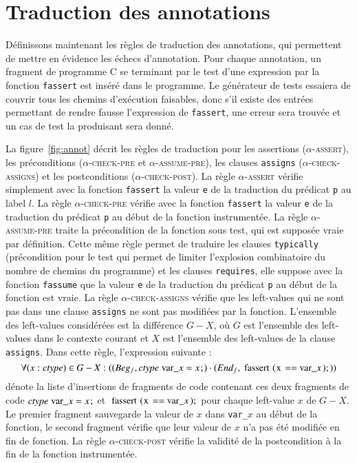 \section{Traduction des annotations \eacsl}
\label{sec:annot}


Définissons maintenant les règles de traduction des
annotations, qui permettent de mettre en évidence les échecs d'annotation.
Pour chaque annotation, un fragment de programme C se terminant par le test
d'une expression par la fonction \lstinline'fassert' est inséré dans le
programme.
Le générateur de tests essaiera de couvrir tous les chemins d'exécution
faisables, donc s'il existe des entrées permettant de rendre fausse
l'expression de \lstinline'fassert', une erreur sera trouvée et un cas de test
la produisant sera donné.



La figure~\ref{fig:annot} décrit les règles de traduction pour les assertions
(\textsc{$\alpha$-assert}), les préconditions (\textsc{$\alpha$-check-pre} et
\textsc{$\alpha$-assume-pre}), les clauses \lstinline'assigns'
(\textsc{$\alpha$-check-assigns}) et les postconditions
(\textsc{$\alpha$-check-post}).
La règle \textsc{$\alpha$-assert} vérifie simplement avec la fonction
\lstinline'fassert' la valeur \lstinline'e' de la traduction du prédicat
\lstinline'p' au label $l$.
La règle \textsc{$\alpha$-check-pre} vérifie avec la fonction
\lstinline'fassert' la valeur \lstinline'e' de la traduction du prédicat
\lstinline'p' au début de la fonction instrumentée.
La règle \textsc{$\alpha$-assume-pre} traite la précondition de la fonction sous
test, qui est supposée vraie par définition.
Cette même règle permet de traduire les clauses \lstinline'typically'
(précondition pour le test qui permet de limiter l'explosion combinatoire du
nombre de chemins du programme) et les clauses \lstinline'requires', elle
suppose avec la fonction \lstinline'fassume' que la valeur \lstinline'e' de la
traduction du prédicat \lstinline'p' au début de la fonction est vraie.
La règle \textsc{$\alpha$-check-assigns} vérifie que les left-values qui ne sont
pas dans une clause \lstinline'assigns' ne sont pas modifiées par la fonction.
L'ensemble des left-values considérées est la différence $G-X$, où $G$ est
l'ensemble des left-values dans le contexte courant et $X$ est l'ensemble des
left-values de la clause \lstinline'assigns'.
Dans cette règle, l'expression suivante :
\[
\forall (x:\mathit{ctype}) \in G-X :
((Beg_f, \mathit{ctype}~\mbox{\lstinline'var_'}x = x\semicolon)
\concat (End_f, \mbox{\lstinline'fassert(x == var_'}x\mbox{\lstinline');'}) )
\]
dénote la liste d'insertions de fragments de code contenant ces deux fragments
de code $\mathit{ctype}~\mbox{\lstinline'var_'}x = x\semicolon$ et
$\mbox{\lstinline'fassert(x == var_'}x\mbox{\lstinline');'}$ pour chaque
left-value $x$ de $G-X$.
Le premier fragment sauvegarde la valeur de $x$ dans \lstinline'var_'$x$ au
début de la fonction, le second fragment vérifie que leur valeur de $x$ n'a pas
été modifiée en fin de fonction.
La règle \textsc{$\alpha$-check-post} vérifie la validité de la postcondition
à la fin de la fonction instrumentée.

